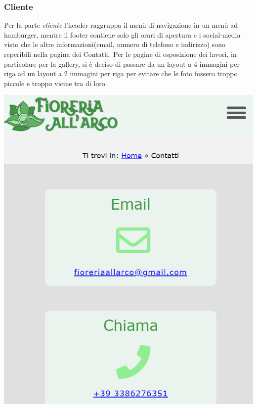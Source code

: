 \subsubsection{Cliente}
Per la parte \textit{cliente} l'header raggruppa il menù di navigazione in un menù ad hamburger, mentre il footer contiene solo gli orari di apertura e i social-media visto che le altre informazioni(email, numero di telefono e indirizzo) sono reperibili nella pagina dei Contatti. Per le pagine di esposizione dei lavori, in particolare per la gallery, si è deciso di passare da un layout a 4 immagini per riga ad un layout a 2 immagini per riga per evitare che le foto fossero troppo piccole e troppo vicine tra di loro.
\begin{center}
\includegraphics[scale = 0.35]{../latex/images/mobileclient.png}\\[0.5cm]
\end{center}
